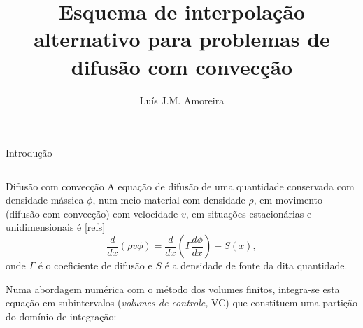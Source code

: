 \documentclass[final,t]{beamer}
\title{\LARGE Esquema de interpolação alternativo para problemas de difusão com
convecção}
\author{Luís J.M. Amoreira}
\institute{\ }
\begin{document}
\begin{frame}{}
    \begin{block}{Introdução}
    \end{block}
\begin{columns}[t]

\begin{column}{0.488\linewidth}
    \begin{block}{Difusão com convecção}
        A equação de difusão de uma quantidade conservada com densidade mássica
        $\phi$, num meio material com densidade $\rho$, em movimento (difusão com
        convecção) com velocidade $v$, em situações estacionárias e
        unidimensionais é [refs]
        \begin{equation*}
            \frac{d}{dx}(\rho v \phi)=
            \frac{d}{dx}\left(\Gamma\frac{d\phi}{dx}\right) + S(x),
        \end{equation*}
        onde $\Gamma$ é o coeficiente de difusão e $S$ é a densidade de fonte da
        dita quantidade.

        \vspace{5mm}
        Numa abordagem numérica com o método dos volumes finitos, integra-se
        esta equação em subintervalos (\emph{volumes de controle,} VC) que
        constituem uma partição do domínio de integração:

        {\centering
            }
\end{block}
\end{column}
\end{columns}
\end{frame}
\end{document}
